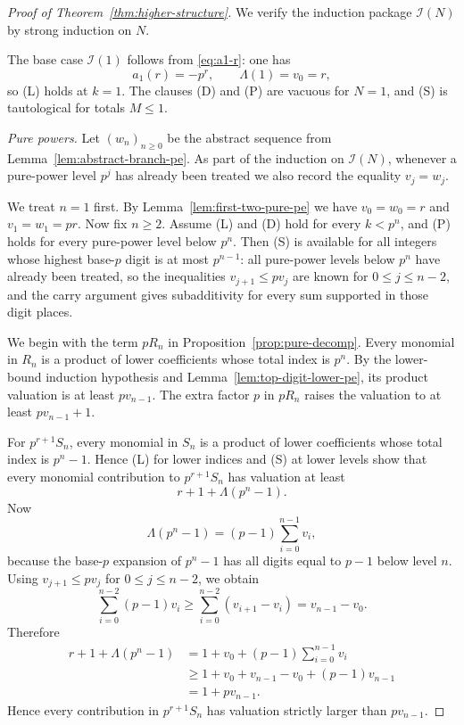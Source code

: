 \documentclass[10pt,a4paper]{amsart}
\begin{document}
\begin{proof}[Proof of Theorem~\ref{thm:higher-structure}]
We verify the induction package $\mathcal I(N)$ by strong induction on $N$.

The base case $\mathcal I(1)$ follows from \eqref{eq:a1-r}: one has
\[
        a_1(r)=-p^r,
        \qquad
        \Lambda(1)=v_0=r,
\]
so (L) holds at $k=1$.  The clauses (D) and (P) are vacuous for $N=1$, and (S) is tautological for totals $M\le1$.

\smallskip
\noindent\emph{Pure powers.}
Let $(w_n)_{n\ge0}$ be the abstract sequence from Lemma~\ref{lem:abstract-branch-pe}.  As part of the induction on $\mathcal I(N)$, whenever a pure-power level $p^j$ has already been treated we also record the equality $v_j=w_j$.

We treat $n=1$ first.  By Lemma~\ref{lem:first-two-pure-pe} we have $v_0=w_0=r$ and $v_1=w_1=pr$.  Now fix $n\ge2$.  Assume (L) and (D) hold for every $k<p^n$, and (P) holds for every pure-power level below $p^n$.  Then (S) is available for all integers whose highest base-$p$ digit is at most $p^{n-1}$: all pure-power levels below $p^n$ have already been treated, so the inequalities $v_{j+1}\le p v_j$ are known for $0\le j\le n-2$, and the carry argument gives subadditivity for every sum supported in those digit places.

We begin with the term $pR_n$ in Proposition~\ref{prop:pure-decomp}.  Every monomial in $R_n$ is a product of lower coefficients whose total index is $p^n$.  By the lower-bound induction hypothesis and Lemma~\ref{lem:top-digit-lower-pe}, its product valuation is at least $p v_{n-1}$.  The extra factor $p$ in $pR_n$ raises the valuation to at least $p v_{n-1}+1$.

For $p^{r+1}S_n$, every monomial in $S_n$ is a product of lower coefficients whose total index is $p^n-1$.  Hence (L) for lower indices and (S) at lower levels show that every monomial contribution to $p^{r+1}S_n$ has valuation at least
\[
        r+1+\Lambda(p^n-1).
\]
Now
\[
        \Lambda(p^n-1)=(p-1)\sum_{i=0}^{n-1}v_i,
\]
because the base-$p$ expansion of $p^n-1$ has all digits equal to $p-1$ below level $n$.  Using $v_{j+1}\le p v_j$ for $0\le j\le n-2$, we obtain
\[
        \sum_{i=0}^{n-2}(p-1)v_i\ge \sum_{i=0}^{n-2}(v_{i+1}-v_i)=v_{n-1}-v_0.
\]
Therefore
\[
\begin{aligned}
        r+1+\Lambda(p^n-1)
        &=1+v_0+(p-1)\sum_{i=0}^{n-1}v_i\\
        &\ge 1+v_0+v_{n-1}-v_0+(p-1)v_{n-1}\\
        &=1+p v_{n-1}.
\end{aligned}
\]
Hence every contribution in $p^{r+1}S_n$ has valuation strictly larger than $p v_{n-1}$.


\end{proof}
\end{document}
